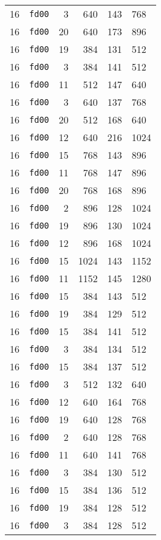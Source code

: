 \documentclass{article}
\begin{document}
\begin{table}[h!]
\begin{tabular}{llrrrl}
    16 & \texttt{fd00} & 3 & 640 & 143 & 768 \\
    16 & \texttt{fd00} & 20 & 640 & 173 & 896 \\
    16 & \texttt{fd00} & 19 & 384 & 131 & 512 \\
    16 & \texttt{fd00} & 3 & 384 & 141 & 512 \\
    16 & \texttt{fd00} & 11 & 512 & 147 & 640 \\
    16 & \texttt{fd00} & 3 & 640 & 137 & 768 \\
    16 & \texttt{fd00} & 20 & 512 & 168 & 640 \\
    16 & \texttt{fd00} & 12 & 640 & 216 & 1024 \\
    16 & \texttt{fd00} & 15 & 768 & 143 & 896 \\
    16 & \texttt{fd00} & 11 & 768 & 147 & 896 \\
    16 & \texttt{fd00} & 20 & 768 & 168 & 896 \\
    16 & \texttt{fd00} & 2 & 896 & 128 & 1024 \\
    16 & \texttt{fd00} & 19 & 896 & 130 & 1024 \\
    16 & \texttt{fd00} & 12 & 896 & 168 & 1024 \\
    16 & \texttt{fd00} & 15 & 1024 & 143 & 1152 \\
    16 & \texttt{fd00} & 11 & 1152 & 145 & 1280 \\
    16 & \texttt{fd00} & 15 & 384 & 143 & 512 \\
    16 & \texttt{fd00} & 19 & 384 & 129 & 512 \\
    16 & \texttt{fd00} & 15 & 384 & 141 & 512 \\
    16 & \texttt{fd00} & 3 & 384 & 134 & 512 \\
    16 & \texttt{fd00} & 15 & 384 & 137 & 512 \\
    16 & \texttt{fd00} & 3 & 512 & 132 & 640 \\
    16 & \texttt{fd00} & 12 & 640 & 164 & 768 \\
    16 & \texttt{fd00} & 19 & 640 & 128 & 768 \\
    16 & \texttt{fd00} & 2 & 640 & 128 & 768 \\
    16 & \texttt{fd00} & 11 & 640 & 141 & 768 \\
    16 & \texttt{fd00} & 3 & 384 & 130 & 512 \\
    16 & \texttt{fd00} & 15 & 384 & 136 & 512 \\
    16 & \texttt{fd00} & 19 & 384 & 128 & 512 \\
    16 & \texttt{fd00} & 3 & 384 & 128 & 512 \\

\end{tabular}
\end{table}
\end{document}
